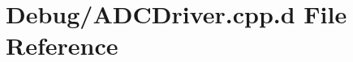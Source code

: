\hypertarget{_debug_2_a_d_c_driver_8cpp_8d}{\section{\-Debug/\-A\-D\-C\-Driver.cpp.\-d \-File \-Reference}
\label{_debug_2_a_d_c_driver_8cpp_8d}
}
